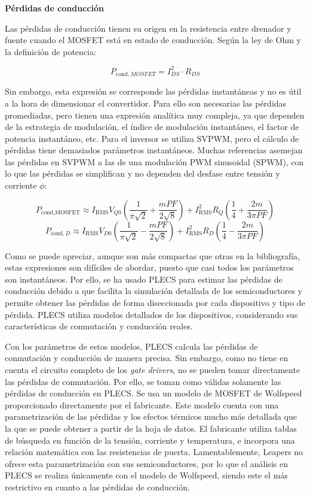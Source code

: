 \textbf{Pérdidas de conducción}

Las pérdidas de conducción tienen su origen en la resistencia entre drenador y fuente cuando el MOSFET está en estado de conducción. Según la ley de Ohm y la definición de potencia:

\[
P_{\text{cond},MOSFET} = I_{DS}^2\cdot R_{DS}
\]

Sin embargo, esta expresión se corresponde las pérdidas instantáneas y no es útil a la hora de dimensionar el convertidor. Para ello son necesarias las pérdidas promediadas, pero tienen una expresión analítica muy compleja, ya que dependen de la estrategia de modulación, el índice de modulación instantáneo, el factor de potencia instantáneo, etc. Para el inversor se utiliza SVPWM, pero el cálculo de pérdidas tiene demasiados parámetros instantáneos. Muchas referencias asemejan las pérdidas en SVPWM a las de una modulación PWM sinusoidal (SPWM), con lo que las pérdidas se simplifican y no dependen del desfase entre tensión y corriente $\phi$:

\[
P_{\text{cond,MOSFET}} \approx I_{\text{RMS}} V_{Q0} \left(\frac{1}{\pi\sqrt{2}} + \frac{m PF}{2\sqrt{8}}\right) + I_{\text{RMS}}^2 R_Q \left(\frac{1}{4} + \frac{2m}{3\pi PF}\right)
\]
\[
P_{\text{cond},D} \approx I_{\text{RMS}} V_{D0} \left(\frac{1}{\pi\sqrt{2}} - \frac{m PF}{2\sqrt{8}}\right) + I_{\text{RMS}}^2 R_D \left(\frac{1}{4} - \frac{2m}{3\pi PF}\right)
\]

Como se puede apreciar, aunque son más compactas que otras en la bibliografía, estas expresiones son difíciles de abordar, puesto que casi todos los parámetros son instantáneos. Por ello, se ha usado PLECS para estimar las pérdidas de conducción debido a que facilita la simulación detallada de los semiconductores y permite obtener las pérdidas de forma diseccionada por cada dispositivo y tipo de pérdida. PLECS utiliza modelos detallados de los dispositivos, considerando sus características de conmutación y conducción reales.

Con los parámetros de estos modelos, PLECS calcula las pérdidas de conmutación y conducción de manera precisa. Sin embargo, como no tiene en cuenta el circuito completo de los \textit{gate drivers}, no se pueden tomar directamente las pérdidas de conmutación. Por ello, se toman como válidas solamente las pérdidas de conducción en PLECS. Se usa un modelo de MOSFET de Wolfspeed proporcionado directamente por el fabricante. Este modelo cuenta con una parametrización de las pérdidas y los efectos térmicos mucho más detallada que la que se puede obtener a partir de la hoja de datos. El fabricante utiliza tablas de búsqueda en función de la tensión, corriente y temperatura, e incorpora una relación matemática con las resistencias de puerta. Lamentablemente, Leapers no ofrece esta parametrización con sus semiconductores, por lo que el análisis en PLECS se realiza únicamente con el modelo de Wolfspeed, siendo este el más restrictivo en cuanto a las pérdidas de conducción.

